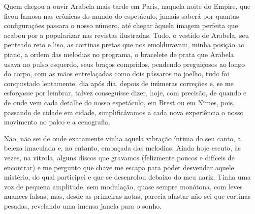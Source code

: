 Quem chegou a ouvir Arabela mais tarde em Paris, naquela noite do
Empire, que ficou famosa nas crônicas do mundo do espetáculo, jamais
saberá por quantas configurações passara o nosso número, até chegar
àquela imagem perfeita que acabou por a popularizar nas revistas
ilustradas. Tudo, o vestido de Arabela, seu penteado reto e liso, as
cortinas pretas que nos emolduravam, minha posição ao piano, a ordem das
melodias no programa, o bracelete de prata que Arabela usava no pulso
esquerdo, seus braços compridos, pendendo preguiçosos ao longo do corpo,
com as mãos entrelaçadas como dois pássaros no joelho, tudo foi
conquistado lentamente, dia após dia, depois de inúmeras correções e, se
me esforçasse por lembrar, talvez conseguisse dizer, hoje, com precisão,
de quando e de onde vem cada detalhe do nosso espetáculo, em Brest ou em
Nîmes, pois, passando de cidade em cidade, simplificávamos a cada nova
experiência o nosso movimento no palco e a cenografia.



Não, não sei de onde exatamente vinha aquela vibração íntima do seu
canto, a beleza imaculada e, no entanto, embaçada das melodias. Ainda
hoje escuto, às vezes, na vitrola, alguns discos que gravamos
(felizmente poucos e difíceis de encontrar) e me pergunto que chave me
escapa para poder desvendar aquele mistério, do qual participei e que se
desenrolou debaixo do meu nariz. Tinha uma voz de pequena amplitude, sem
modulação, quase sempre monótona, com leves nuances falsas, mas, desde
as primeiras notas, parecia afastar não sei que cortinas pesadas,
revelando uma imensa janela para o sonho.

